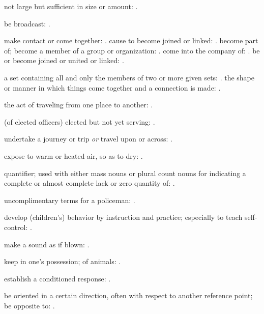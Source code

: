   not large but sufficient in size or amount:   .

  be broadcast: .

  make contact or come together:   . cause to become joined or linked:   . become part of; become a member of a group or organization:   . come into the company of: . be or become joined or united or linked:   .

  a set containing all and only the members of two or more given sets:   . the shape or manner in which things come together and a connection is made:   .

  the act of traveling from one place to another:   .

  (of elected officers) elected but not yet serving:   .

  undertake a journey or trip \textit{or} travel upon or across:   .

  expose to warm or heated air, so as to dry: .

  quantifier; used with either mass nouns or plural count nouns for indicating a complete or almost complete lack or zero quantity of: .

  uncomplimentary terms for a policeman:   .

  develop (children's) behavior by instruction and practice; especially to teach self-control:   .

  make a sound as if blown: .

  keep in one's possession; of animals:   .

  establish a conditioned response: .

  be oriented in a certain direction, often with respect to another reference point; be opposite to:   .

